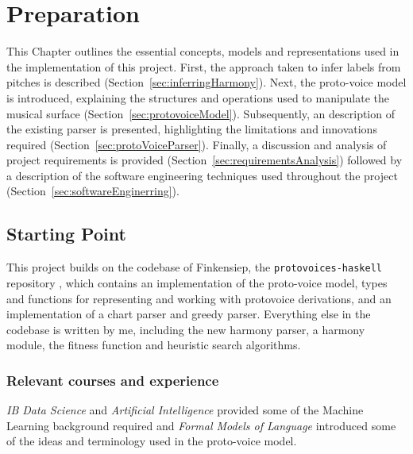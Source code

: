 \documentclass[12pt,a4paper,twoside,openany]{report} \usepackage[pdfborder={0 0 0}]{hyperref}    %
\theoremstyle{definition} \newtheorem{definition}{Definition}[section]
\begin{document}
    \chapter{Preparation}%
    This Chapter outlines the essential concepts, models and representations used in the implementation of this project.
    First, the approach taken to infer labels from pitches is described (Section~\ref{sec:inferringHarmony}).
    Next, the proto-voice model is introduced, explaining the structures and operations used to manipulate the musical surface (Section~\ref{sec:protovoiceModel}). 
    Subsequently, an description of the existing parser is presented, highlighting the limitations and innovations
    required (Section~\ref{sec:protoVoiceParser}).
    Finally, a discussion and analysis of project requirements is provided
    (Section~\ref{sec:requirementsAnalysis}) followed by a description of the software engineering techniques used
    throughout the project (Section~\ref{sec:softwareEnginerring}).

\section{Starting Point}
\label{sec:startingPoint}


This project builds on the codebase of Finkensiep, the \texttt{protovoices-haskell}
repository \cite{finkensiepProtovoicesModelTonal2021}, which contains an implementation 
of the proto-voice model, types and functions for representing and working with protovoice derivations, and an
implementation of a chart parser and greedy parser. Everything else in the codebase is written by me, including the new
harmony parser, a harmony module, the fitness function and heuristic search algorithms.  


\subsection{Relevant courses and experience}
\label{sub:coursesExperience}

\textit{IB Data Science} and \textit{Artificial Intelligence} provided some of the Machine Learning background required
and \textit{Formal Models of Language} introduced some of the ideas and terminology used in the proto-voice model.
\end{document}
